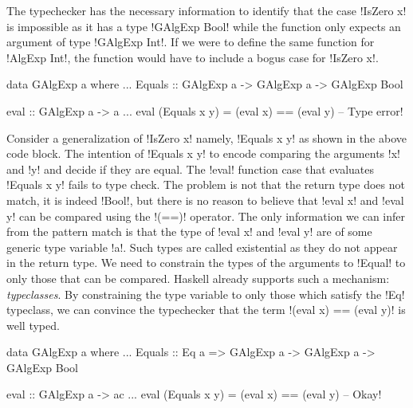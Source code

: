 \documentclass[screen,nonacm,manuscript,review]{acmart} %
\begin{document}
The typechecker has the necessary information to identify that the case
!IsZero x! is impossible as it has a type !GAlgExp Bool! while the
function only expects an argument of type !GAlgExp Int!. If we were to
define the same function for !AlgExp Int!, the function
would have to include a bogus case for !IsZero x!.

\begin{minipage}[ht]{0.6\linewidth}
\begin{CenteredBox}
\begin{code}
data GAlgExp a where
  ...
  Equals :: GAlgExp a -> GAlgExp a -> GAlgExp Bool
\end{code}
\end{CenteredBox}
\end{minipage}%
\begin{minipage}[ht]{0.4\linewidth}
\begin{CenteredBox}
\begin{code}
eval :: GAlgExp a -> a
...
eval (Equals x y) = (eval x) == (eval y)
                           -- Type error!
\end{code}
\end{CenteredBox}
\end{minipage}

Consider a generalization of !IsZero x! namely, !Equals x y! as shown
in the above code block. The intention of !Equals x y! to
encode comparing the arguments !x! and !y! and decide if they are
equal. The !eval! function case that evaluates !Equals x y! fails
to type check. The problem is not that the return type does not match,
it is indeed !Bool!, but there is no reason to believe that
!eval x! and !eval y! can be compared using the !(==)! operator. The
only information we can infer from the pattern match is that
the type of !eval x! and !eval y! are of some generic type variable
!a!. Such types are called existential as they do not appear in
the return type. We need to constrain the types of the
arguments to !Equal! to only those that can be compared.
Haskell already supports such a mechanism: \emph{typeclasses}.
By constraining the type variable to only those which satisfy
the !Eq! typeclass, we can convince the typechecker that the
term !(eval x) == (eval y)! is well typed.


\begin{minipage}[ht]{0.5\linewidth}
\begin{CenteredBox}
\begin{code}
data GAlgExp a where
...
   Equals :: Eq a => GAlgExp a -> GAlgExp a
                  -> GAlgExp Bool
\end{code}
\end{CenteredBox}
\end{minipage}%
\begin{minipage}[ht]{0.4\linewidth}
\begin{CenteredBox}
\begin{code}
eval :: GAlgExp a -> ac
...
eval (Equals x y) = (eval x) == (eval y)
                              -- Okay!
\end{code}
\end{CenteredBox}
\end{minipage}
\end{document}
